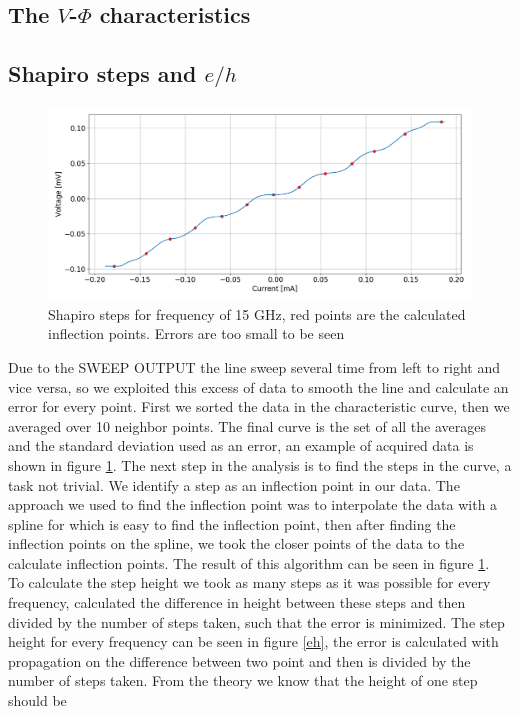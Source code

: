 \documentclass[a4paper,10pt]{article}
\begin{document}
\subsection{The $V$-$\Phi$ characteristics}
\subsection{Shapiro steps and $e/h$}
\begin{figure}[H]
\centering
\includegraphics[width = \textwidth]{shapirosteps}
\caption{Shapiro steps for frequency of 15 GHz, red points are the calculated inflection points. Errors are too small to be seen}\label{shapiro}
\end{figure}
Due to the SWEEP OUTPUT the line sweep several time from left to right and vice versa, so we exploited this excess of data to smooth the line and calculate an error for every point. First we sorted the data in the characteristic curve, then we averaged over 10 neighbor points. The final curve is the set of all the averages and the standard deviation used as an error, an example of acquired data is shown in figure \ref{shapiro}. The next step in the analysis is to find the steps in the curve, a task not trivial. We identify a step as an inflection point in our data. The approach we used to find the inflection point was to interpolate the data with a spline for which is easy to find the inflection point, then after finding the inflection points on the spline, we took the closer points of the data to the calculate inflection points. The result of this algorithm can be seen in figure \ref{shapiro}.\\
To calculate the step height we took as many steps as it was possible for every frequency, calculated the difference in height between these steps and then divided by the number of steps taken, such that the error is minimized. The step height for every frequency can be seen in figure \ref{eh}, the error is calculated with propagation on the difference between two point and then is divided by the number of steps taken. From the theory we know that the height of one step should be
\end{document}
